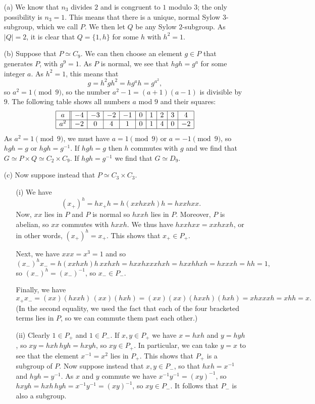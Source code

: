 \documentclass{amsart}
\renewcommand{\:}{\colon}
\newcommand{\tm}{\times}
\theoremstyle{definition}
\newenvironment{solution}{{\noindent\bf Solution:}}{}
\begin{document}
\begin{solution}
 \begin{itemize}
  \item[(a)] We know that $n_3$ divides $2$ and is congruent to $1$
   modulo $3$; the only possibility is $n_3=1$.  This means that there
   is a unique, normal Sylow $3$-subgroup, which we call $P$.  We then
   let $Q$ be any Sylow $2$-subgroup.  As $|Q|=2$, it is clear that
   $Q=\{1,h\}$ for some $h$ with $h^2=1$.
  \item[(b)] Suppose that $P\simeq C_9$.  We can then choose an
   element $g\in P$ that generates $P$, with $g^9=1$.  As $P$ is
   normal, we see that $hgh=g^a$ for some integer $a$.  As $h^2=1$,
   this means that
   \[ g = h^2gh^2 = hg^ah=g^{a^2}, \]
   so $a^2=1\pmod{9}$, so the number $a^2-1=(a+1)(a-1)$ is divisible
   by $9$.  The following table shows all numbers $a$ mod $9$ and
   their squares:
   \[ \begin{array}{|c||c|c|c|c|c|c|c|c|c|} 
       \hline
        a   & -4 & -3 & -2 & -1 & 0 & 1 & 2 & 3 & 4 \\
       \hline
        a^2 & -2 &  0 &  4 &  1 & 0 & 1 & 4 & 0 & -2 \\
       \hline
      \end{array}
   \]
   As $a^2=1\pmod{9}$, we must have $a=1\pmod{9}$ or $a=-1\pmod{9}$,
   so $hgh=g$ or $hgh=g^{-1}$.  If $hgh=g$ then $h$ commutes with $g$
   and we find that $G\simeq P\tm Q\simeq C_2\tm C_9$.  If
   $hgh=g^{-1}$ we find that $G\simeq D_9$.
  \item[(c)] Now suppose instead that $P\simeq C_3\tm C_3$.
   \begin{itemize}
    \item[(i)] We have
     \[ (x_+)^h = hx_+h = h(xxhxxh)h = hxxhxx. \]
     Now, $xx$ lies in $P$ and $P$ is normal so $hxxh$ lies in $P$.
     Moreover, $P$ is abelian, so $xx$ commutes with $hxxh$.  We 
     thus have $hxxhxx=xxhxxh$, or in other words, $(x_+)^h=x_+$.
     This shows that $x_+\in P_+$.

     Next, we have $xxx=x^3=1$ and so 
     \[ (x_-)^h x_- = h(xxhxh)h\,xxhxh = 
         hxxhxxxhxh = hxxhhxh = hxxxh = hh = 1,
     \]
     so $(x_-)^h=(x_-)^{-1}$, so $x_-\in P_-$.

     Finally, we have
     \[ x_+ x_- = (xx)(hxxh)\,(xx)(hxh) = (xx)(xx)(hxxh)(hxh) = 
         xhxxxh = xhh = x.
     \]
     (In the second equality, we used the fact that each of the four
     bracketed terms lies in $P$, so we can commute them past each
     other.) 
    \item[(ii)] Clearly $1\in P_+$ and $1\in P_-$.  If $x,y\in P_+$ we
     have $x=hxh$ and $y=hyh$, so $xy=hxh\,hyh=hxyh$, so $xy\in P_+$.
     In particular, we can take $y=x$ to see that the element
     $x^{-1}=x^2$ lies in $P_+$.  This shows that $P_+$ is a subgroup
     of $P$.  Now suppose instead that $x,y\in P_-$, so that
     $hxh=x^{-1}$ and $hyh=y^{-1}$.  As $x$ and $y$ commute we have
     $x^{-1}y^{-1}=(xy)^{-1}$, so
     $hxyh=hxh\,hyh=x^{-1}y^{-1}=(xy)^{-1}$, so $xy\in P_-$.  It
     follows that $P_-$ is also a subgroup.


\end{itemize}
\end{itemize}
\end{solution}
\end{document}
